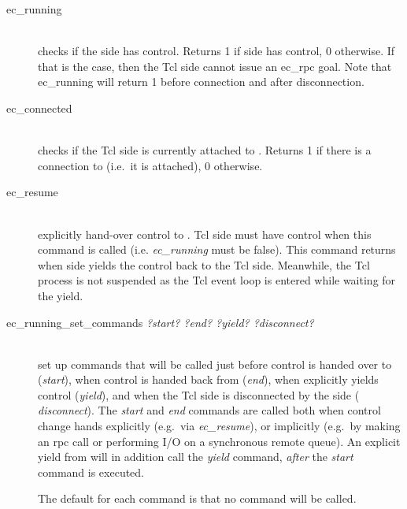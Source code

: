 \begin{description}
\item[ec_running]\ \\
	checks if the {\eclipse} side has control. Returns 1 if {\eclipse}
	side has control, 0 otherwise. If that is the case,
	then the Tcl side cannot issue an ec_rpc goal. Note that ec_running
	will return 1 before connection and after disconnection.
\item[ec_connected]\ \\
        checks if the Tcl side is currently attached to {\eclipse}. Returns
        1 if there is a connection to {\eclipse} (i.e.\ it is attached), 0
        otherwise. 
\item[ec_resume]\ \\
	explicitly hand-over control to {\eclipse}. Tcl side must have
	control when this command is called (i.e. {\it ec_running\/} must
	be false). This command returns when {\eclipse} side yields the
	control back to the Tcl side. Meanwhile, the Tcl process is not
        suspended as the Tcl event loop is entered while waiting for the
	yield. 
\item[ec_running_set_commands {\it ?start? ?end? ?yield? ?disconnect?}]\ \\
	set up commands that will be called just before control is handed
	over to {\eclipse} ({\it start}), when control is handed back from
	{\eclipse} ({\it end}), when {\eclipse} explicitly yields control
	({\it yield}), and when the Tcl side is
	disconnected by the {\eclipse} side ({\it
	disconnect}). The {\it start} and {\it end} commands are called
	both when control change hands explicitly (e.g.\ via {\it
	ec_resume}), or implicitly (e.g.\ by making an rpc call or
	performing I/O on a synchronous remote queue). An explicit yield
	from {\eclipse} will in addition call the {\it yield\/} command, {\it
	after\/} the {\it start\/} command is executed.

	The default for each command is that no command will be called.


\end{description}
